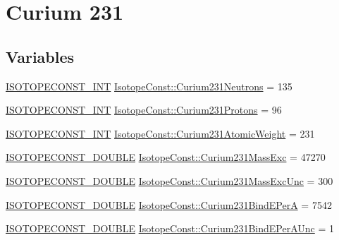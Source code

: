 \hypertarget{group___isotope_const-_curium-_cm231}{}\section{Curium 231}
\label{group___isotope_const-_curium-_cm231}
\subsection*{Variables}
\begin{DoxyCompactItemize}
\item 
\mbox{\hyperlink{group___isotope_const-_macros_ga5f18360b3e99483a35c32d789e62621c}{I\+S\+O\+T\+O\+P\+E\+C\+O\+N\+S\+T\+\_\+\+I\+NT}} \mbox{\hyperlink{group___isotope_const-_curium-_cm231_gaff4548ad711602de87e29683f9ea8a82}{Isotope\+Const\+::\+Curium231\+Neutrons}} = 135
\item 
\mbox{\hyperlink{group___isotope_const-_macros_ga5f18360b3e99483a35c32d789e62621c}{I\+S\+O\+T\+O\+P\+E\+C\+O\+N\+S\+T\+\_\+\+I\+NT}} \mbox{\hyperlink{group___isotope_const-_curium-_cm231_gaa64122957f5b7777a4a08798ec806cfe}{Isotope\+Const\+::\+Curium231\+Protons}} = 96
\item 
\mbox{\hyperlink{group___isotope_const-_macros_ga5f18360b3e99483a35c32d789e62621c}{I\+S\+O\+T\+O\+P\+E\+C\+O\+N\+S\+T\+\_\+\+I\+NT}} \mbox{\hyperlink{group___isotope_const-_curium-_cm231_ga405cdf825c84e0dfb4b46977a672d377}{Isotope\+Const\+::\+Curium231\+Atomic\+Weight}} = 231
\item 
\mbox{\hyperlink{group___isotope_const-_macros_ga8f45a7272ce02c0b4c65c44636ed719a}{I\+S\+O\+T\+O\+P\+E\+C\+O\+N\+S\+T\+\_\+\+D\+O\+U\+B\+LE}} \mbox{\hyperlink{group___isotope_const-_curium-_cm231_ga04befaaa2ceb25dce3a530a19bb582d5}{Isotope\+Const\+::\+Curium231\+Mass\+Exc}} = 47270
\item 
\mbox{\hyperlink{group___isotope_const-_macros_ga8f45a7272ce02c0b4c65c44636ed719a}{I\+S\+O\+T\+O\+P\+E\+C\+O\+N\+S\+T\+\_\+\+D\+O\+U\+B\+LE}} \mbox{\hyperlink{group___isotope_const-_curium-_cm231_ga67aa4e15b242063b3f21f01ca001bbc3}{Isotope\+Const\+::\+Curium231\+Mass\+Exc\+Unc}} = 300
\item 
\mbox{\hyperlink{group___isotope_const-_macros_ga8f45a7272ce02c0b4c65c44636ed719a}{I\+S\+O\+T\+O\+P\+E\+C\+O\+N\+S\+T\+\_\+\+D\+O\+U\+B\+LE}} \mbox{\hyperlink{group___isotope_const-_curium-_cm231_gab3e7624892609d81bd7a1138a635d9e4}{Isotope\+Const\+::\+Curium231\+Bind\+E\+PerA}} = 7542
\item 
\mbox{\hyperlink{group___isotope_const-_macros_ga8f45a7272ce02c0b4c65c44636ed719a}{I\+S\+O\+T\+O\+P\+E\+C\+O\+N\+S\+T\+\_\+\+D\+O\+U\+B\+LE}} \mbox{\hyperlink{group___isotope_const-_curium-_cm231_ga2081f829847568334b5b575e9f27d706}{Isotope\+Const\+::\+Curium231\+Bind\+E\+Per\+A\+Unc}} = 1

\end{DoxyCompactItemize}

